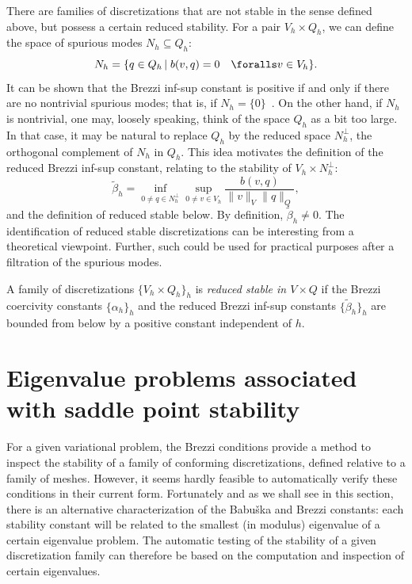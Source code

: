 There are families of discretizations that are not stable in the sense
defined above, but possess a certain reduced stability. For a pair
$V_h \times Q_h$, we can define the space of spurious modes $N_h
\subseteq Q_h$:
\begin{equation}
  N_h
  = \{q \in Q_h \, | \; b(v, q) = 0 \quad
  \foralls v \in V_h\}.
\end{equation}
It can be shown that the Brezzi inf-sup constant is positive if and
only if there are no nontrivial spurious modes; that is, if $N_h = \{
0 \}$~\citep{Qin1994}.  On the other hand, if $N_h$ is
nontrivial, one may, loosely speaking, think of the space $Q_h$ as a
bit too large.  In that case, it may be natural to replace $Q_h$ by
the reduced space $N_h^{\perp}$, the orthogonal complement of $N_h$ in
$Q_h$. This idea motivates the definition of the reduced Brezzi
inf-sup constant, relating to the stability of $V_h \times
N_h^{\perp}$:
\begin{equation}
  \label{rognes:eq:reduced:infsup}
  \tilde \beta_h =
  \inf_{0 \not = q \in N_h^{\perp}}
  \sup_{0 \not = v \in V_h}
  \frac{b(v, q)}
       {\|v\|_{V} \|q\|_{Q}},
\end{equation}
and the definition of reduced stable below. By definition, $\tilde
\beta_h \not = 0$. The identification of reduced stable
discretizations can be interesting from a theoretical
viewpoint. Further, such could be used for practical purposes after a
filtration of the spurious modes.
\begin{definition}
  \label{rognes:def:reduced_stable}
  A family of discretizations $\{V_h \times Q_h\}_h$ is \emph{reduced
    stable in $V \times Q$} if the Brezzi coercivity constants
  $\{\alpha_h\}_h$ and the reduced Brezzi inf-sup constants $\{ \tilde
  \beta_h \}_h$ are bounded from below by a positive constant
  independent of $h$.
\end{definition}


\section{Eigenvalue problems associated with saddle point stability}

For a given variational problem, the Brezzi conditions provide a
method to inspect the stability of a family of conforming
discretizations, defined relative to a family of meshes. However, it
seems hardly feasible to automatically verify these conditions in
their current form. Fortunately and as we shall see in this section,
there is an alternative characterization of the Babu\v ska and Brezzi
constants: each stability constant will be related to the smallest (in
modulus) eigenvalue of a certain eigenvalue problem. The automatic
testing of the stability of a given discretization family can
therefore be based on the computation and inspection of certain
eigenvalues.

